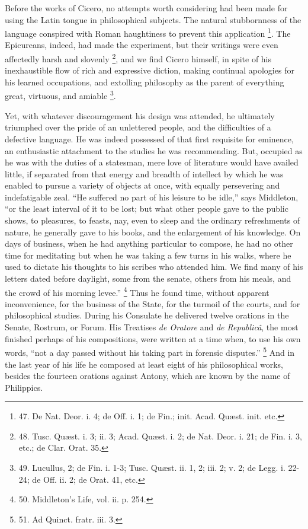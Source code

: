 Before the works of Cicero, no
attempts worth considering had been made for using the Latin tongue in
philosophical subjects. The natural stubbornness of the language
conspired with Roman haughtiness to prevent this application \footnote{47. De Nat. Deor. i. 4; de
Off. i. 1; de Fin.; init. Acad. Quæst. init. etc.}. The Epicureans, indeed, had made the experiment, but their
writings were even affectedly harsh and slovenly \footnote{48. Tusc. Quæst. i. 3; ii. 3;
Acad. Quæst. i. 2; de Nat. Deor. i. 21; de Fin. i. 3, etc.; de Clar.
Orat. 35.}, and we find Cicero himself, in spite of his inexhaustible
flow of rich and expressive diction, making continual apologies for
his learned occupations, and extolling philosophy as the parent of
everything great, virtuous, and amiable \footnote{49. Lucullus, 2; de Fin. i.
1-3; Tusc. Quæst. ii. 1, 2; iii. 2; v. 2; de Legg. i. 22-24; de Off.
ii. 2; de Orat. 41, etc.}.

Yet, with whatever
discouragement his design was attended, he ultimately triumphed over
the pride of an unlettered people, and the difficulties of a defective
language. He was indeed possessed of that first requisite for
eminence, an enthusiastic attachment to the studies he was
recommending. But, occupied as he was with the duties of a statesman,
mere love of literature would have availed little, if separated from
that energy and breadth of intellect by which he was enabled to pursue
a variety of objects at once, with equally persevering and
indefatigable zeal. ``He suffered no part of his leisure to be idle,''
says Middleton, ``or the least interval of it to be lost; but what
other people gave to the public shows, to pleasures, to feasts,
nay, even to sleep and the ordinary refreshments of nature, he
generally gave to his books, and the enlargement of his knowledge. On
days of business, when he had anything particular to compose, he had
no other time for meditating but when he was taking a few turns in his
walks, where he used to dictate his thoughts to his scribes who
attended him. We find many of his letters dated before daylight, some
from the senate, others from his meals, and the crowd of his morning
levee.'' \footnote{50. Middleton's Life, vol. ii.
p. 254.} Thus he found
time, without apparent inconvenience, for the business of the State,
for the turmoil of the courts, and for philosophical studies. During
his Consulate he delivered twelve orations in the Senate, Rostrum, or
Forum. His Treatises \emph{de Oratore} and \emph{de Republicâ}, the
most finished perhaps of his compositions, were written at a time
when, to use his own words, ``not a day passed without his taking part
in forensic disputes.'' \footnote{51. Ad Quinct. fratr. iii. 3.}
And in the last year of his life he composed at least eight of his
philosophical works, besides the fourteen orations against Antony,
which are known by the name of Philippics.

